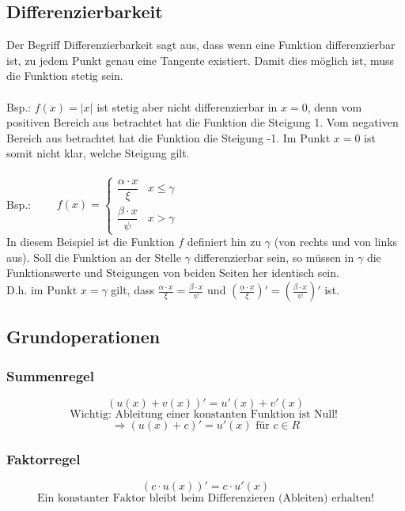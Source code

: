 \subsection{Differenzierbarkeit}
Der Begriff Differenzierbarkeit sagt aus, dass wenn eine Funktion
differenzierbar ist, zu jedem Punkt genau eine Tangente existiert. 
Damit dies möglich ist, muss die Funktion stetig sein.\\\\
Bsp.: $f(x)=|x|$ ist stetig aber nicht differenzierbar in $x=0$, 
denn vom positiven Bereich aus betrachtet hat die Funktion die Steigung 1.
Vom negativen Bereich aus betrachtet hat die Funktion die Steigung -1. 
Im Punkt $x=0$ ist somit nicht klar, welche Steigung gilt.\\\\
Bsp.: 
$ \quad \quad f(x) = \left\lbrace 
\begin{array}{ll}
	\dfrac{\alpha \cdot x}{\xi} & x \leq \gamma \\
	\dfrac{\beta \cdot x}{\psi}  & x > \gamma 
\end{array} \right.  $ \\
In diesem Beispiel ist die Funktion $f$ definiert hin zu $\gamma$ 
(von rechts und von links aus).
Soll die Funktion an der Stelle $\gamma$ differenzierbar sein, 
so müssen in $\gamma$ die Funktionswerte und Steigungen von beiden Seiten her
identisch sein. \\
D.h. im Punkt $x=\gamma$ gilt, dass 
$\frac{\alpha \cdot x}{\xi} = \frac{\beta \cdot x}{\psi}$ und
$\left(\frac{\alpha \cdot x}{\xi}\right)' = 
 \left(\frac{\beta \cdot x}{\psi} \right)'$ ist.

\subsection{Grundoperationen}

\subsubsection{Summenregel}
\[ \boxed{ (u(x) + v(x))' = u'(x) + v'(x) } \]
\[ \text{Wichtig: Ableitung einer konstanten Funktion ist Null! } \]
\[ \Rightarrow (u(x) + c)' = u'(x) \text{ für } c \in R \]

\subsubsection{Faktorregel}
\[ \boxed{ (c \cdot u(x))' = c \cdot u'(x) } \]
\[ \text{Ein konstanter Faktor bleibt beim Differenzieren (Ableiten) erhalten!} \]

